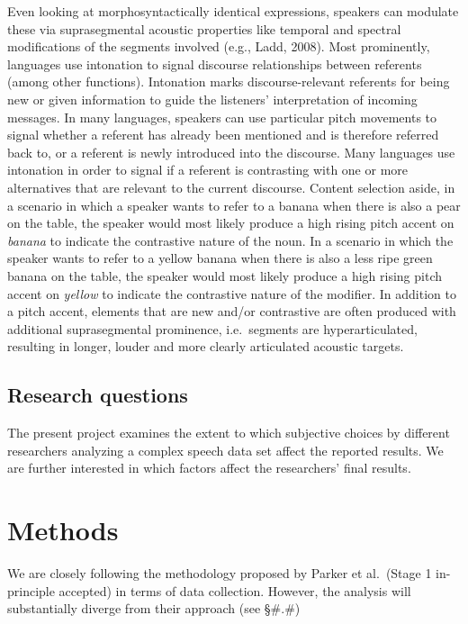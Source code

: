 \documentclass[
  english,
  man,floatsintext]{apa6}
\begin{document}
Even looking at morphosyntactically identical expressions, speakers can modulate these via suprasegmental acoustic properties like temporal and spectral modifications of the segments involved (e.g., Ladd, 2008).
Most prominently, languages use intonation to signal discourse relationships between referents (among other functions).
Intonation marks discourse-relevant referents for being new or given information to guide the listeners' interpretation of incoming messages.
In many languages, speakers can use particular pitch movements to signal whether a referent has already been mentioned and is therefore referred back to, or a referent is newly introduced into the discourse.
Many languages use intonation in order to signal if a referent is contrasting with one or more alternatives that are relevant to the current discourse.
Content selection aside, in a scenario in which a speaker wants to refer to a banana when there is also a pear on the table, the speaker would most likely produce a high rising pitch accent on \emph{banana} to indicate the contrastive nature of the noun.
In a scenario in which the speaker wants to refer to a yellow banana when there is also a less ripe green banana on the table, the speaker would most likely produce a high rising pitch accent on \emph{yellow} to indicate the contrastive nature of the modifier.
In addition to a pitch accent, elements that are new and/or contrastive are often produced with additional suprasegmental prominence, i.e.~segments are hyperarticulated, resulting in longer, louder and more clearly articulated acoustic targets.

\hypertarget{research-questions}{%
\subsection{Research questions}\label{research-questions}}

The present project examines the extent to which subjective choices by different researchers analyzing a complex speech data set affect the reported results.
We are further interested in which factors affect the researchers' final results.

\hypertarget{methods}{%
\section{Methods}\label{methods}}

We are closely following the methodology proposed by Parker et al.~(Stage 1 in-principle accepted) in terms of data collection.
However, the analysis will substantially diverge from their approach (see §\#.\#)
\end{document}
